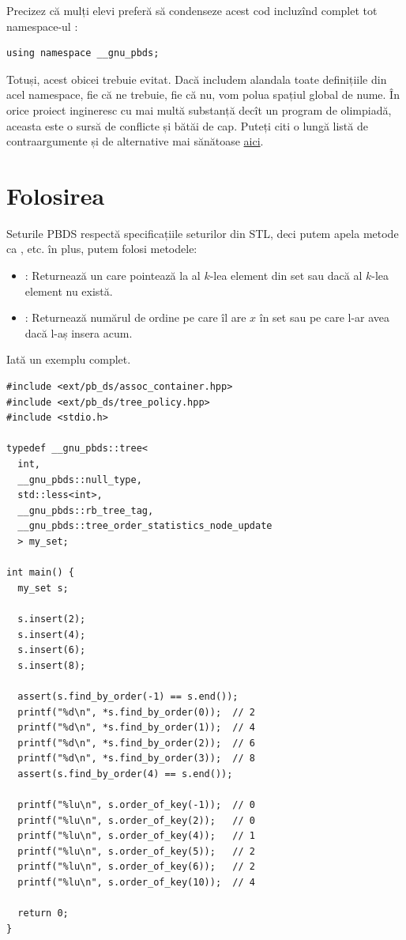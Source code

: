 \documentclass[../main.tex]{subfiles}
\begin{document}
Precizez că mulți elevi preferă să condenseze acest cod incluzînd complet tot namespace-ul :

\begin{verbatim}
using namespace __gnu_pbds;
\end{verbatim}

Totuși, acest obicei trebuie evitat. Dacă includem alandala toate definițiile din acel namespace, fie că ne trebuie, fie că nu, vom polua spațiul global de nume. În orice proiect ingineresc cu mai multă substanță decît un program de olimpiadă, aceasta este o sursă de conflicte și bătăi de cap. Puteți citi o lungă listă de contraargumente și de alternative mai sănătoase \href{https://stackoverflow.com/q/1452721/6022817}{aici}.


\section{Folosirea}

Seturile PBDS respectă specificațiile seturilor din STL, deci putem apela metode ca ,  etc. în plus, putem folosi metodele:

\begin{itemize}
  \item {}: Returnează un  care pointează la al $k$-lea element din set sau  dacă al $k$-lea element nu există.
  \item {}: Returnează numărul de ordine pe care îl are $x$ în set sau pe care l-ar avea dacă l-aș insera acum.
\end{itemize}

Iată un exemplu complet.

\begin{verbatim}
#include <ext/pb_ds/assoc_container.hpp>
#include <ext/pb_ds/tree_policy.hpp>
#include <stdio.h>

typedef __gnu_pbds::tree<
  int,
  __gnu_pbds::null_type,
  std::less<int>,
  __gnu_pbds::rb_tree_tag,
  __gnu_pbds::tree_order_statistics_node_update
  > my_set;

int main() {
  my_set s;

  s.insert(2);
  s.insert(4);
  s.insert(6);
  s.insert(8);

  assert(s.find_by_order(-1) == s.end());
  printf("%d\n", *s.find_by_order(0));  // 2
  printf("%d\n", *s.find_by_order(1));  // 4
  printf("%d\n", *s.find_by_order(2));  // 6
  printf("%d\n", *s.find_by_order(3));  // 8
  assert(s.find_by_order(4) == s.end());

  printf("%lu\n", s.order_of_key(-1));  // 0
  printf("%lu\n", s.order_of_key(2));   // 0
  printf("%lu\n", s.order_of_key(4));   // 1
  printf("%lu\n", s.order_of_key(5));   // 2
  printf("%lu\n", s.order_of_key(6));   // 2
  printf("%lu\n", s.order_of_key(10));  // 4

  return 0;
}
\end{verbatim}
\end{document}
